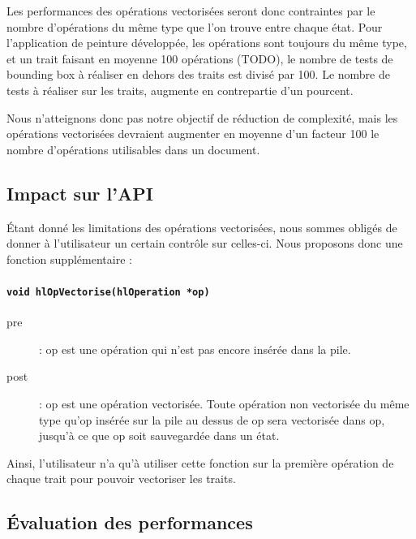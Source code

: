 		Les performances des opérations vectorisées seront donc contraintes par le nombre d'opérations du même type que
		l'on trouve entre chaque état. Pour l'application de peinture développée, les opérations sont toujours du même
		type, et un trait faisant en moyenne 100 opérations (TODO), le nombre de tests de bounding box à réaliser en 
		dehors des traits est divisé par 100. Le nombre de tests à réaliser sur les traits, augmente en contrepartie d'un
		pourcent.

		Nous n'atteignons donc pas notre objectif de réduction de complexité, mais les opérations vectorisées devraient
		augmenter en moyenne d'un facteur 100 le nombre d'opérations utilisables dans un document.

		\subsection{Impact sur l'API}
		Étant donné les limitations des opérations vectorisées, nous sommes obligés de donner à l'utilisateur un
		certain contrôle sur celles-ci. Nous proposons donc une fonction supplémentaire :
			\paragraph{\lstinline$void hlOpVectorise(hlOperation *op)$}
			\begin{description}
				\item[pre]: op est une opération qui n'est pas encore insérée dans la pile.
				\item[post]: op est une opération vectorisée. Toute opération non vectorisée du même
				type qu'op insérée sur la pile au dessus de op sera vectorisée dans op, jusqu'à ce
				que op soit sauvegardée dans un état.
			\end{description}
		Ainsi, l'utilisateur n'a qu'à utiliser cette fonction sur la première opération de chaque trait pour pouvoir
		vectoriser les traits. 
		\subsection{Évaluation des performances}

